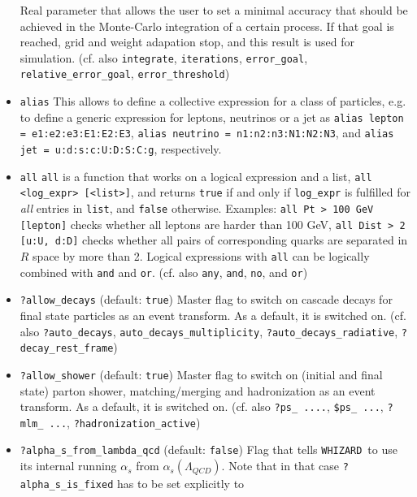 \documentclass[12pt]{book}
\newcommand{\ttt}[1]{\texttt{#1}}
\newcommand{\whizard}{\texttt{WHIZARD}}
\begin{document}
\begin{itemize}
Real parameter that allows the user to set a minimal accuracy that
should be achieved in the Monte-Carlo integration of a certain
process. If that goal is reached, grid and weight adapation stop, and
this result is used for simulation. (cf. also \ttt{integrate},
\ttt{iterations}, \ttt{error\_goal}, \ttt{relative\_error\_goal},
\ttt{error\_threshold}) 
\item 
\ttt{alias} \newline
This allows to define a collective expression for a class of
particles, e.g. to define a generic expression for leptons, neutrinos
or a jet as \ttt{alias lepton = e1:e2:e3:E1:E2:E3}, \ttt{alias
neutrino = n1:n2:n3:N1:N2:N3}, and \ttt{alias jet =
u:d:s:c:U:D:S:C:g}, respectively.
\item 
\ttt{all} \newline
\ttt{all} is a function that works on a logical expression and a list, 
\ttt{all <log\_expr> [<list>]}, and returns \ttt{true} if and only if
\ttt{log\_expr} is fulfilled for {\em all} entries in \ttt{list}, and
\ttt{false} otherwise. Examples: \ttt{all Pt > 100 GeV [lepton]}
checks whether all leptons are harder than 100 GeV, \ttt{all Dist > 2
  [u:U, d:D]} checks whether all pairs of corresponding quarks
are separated in $R$ space by more than 2. Logical expressions with
\ttt{all} can be logically combined with \ttt{and} and
\ttt{or}. (cf. also \ttt{any}, \ttt{and}, \ttt{no}, and \ttt{or}) 
\item
\ttt{?allow\_decays} \qquad (default: \ttt{true}) \newline
Master flag to switch on cascade decays for final state particles as
an event transform. As a default, it is switched on. (cf. also
\ttt{?auto\_decays}, \ttt{auto\_decays\_multiplicity},
\ttt{?auto\_decays\_radiative}, \ttt{?decay\_rest\_frame})
\item
\ttt{?allow\_shower} \qquad (default: \ttt{true}) \newline
Master flag to switch on (initial and final state) parton shower,
matching/merging and hadronization as an event transform. As a
default, it is switched on. (cf. also \ttt{?ps\_ ....}, \ttt{\$ps\_
  ...}, \ttt{?mlm\_ ...}, \ttt{?hadronization\_active}) 
\item
\ttt{?alpha\_s\_from\_lambda\_qcd} \qquad (default: \ttt{false})
\newline 
Flag that tells \whizard\ to use its internal running $\alpha_s$ from
$\alpha_s(\Lambda_{QCD})$. Note that in that case
\ttt{?alpha\_s\_is\_fixed} has  to be set explicitly to

\end{itemize}
\end{document}
